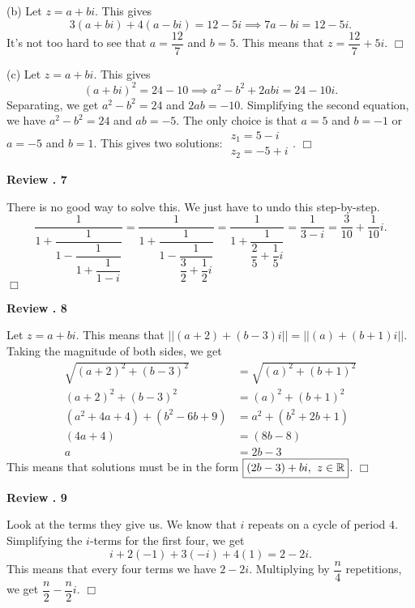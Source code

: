 \documentclass[lang=en,11pt]{elegantbook}
\begin{document}
(b) Let $z=a+bi$.  This gives $$3(a+bi)+4(a-bi)=12-5i \implies 7a-bi=12-5i.$$  It's not too hard to see that $a=\dfrac{12}{7}$ and $b=5$.  This means that $\boxed{z=\dfrac{12}{7}+5i}.$ $\Box$\vspace{3mm}

(c) Let $z=a+bi$.  This gives $$(a+bi)^2=24-10 \implies a^2-b^2+2abi=24-10i.$$  Separating, we get $a^2-b^2=24$ and $2ab=-10$.  Simplifying the second equation, we have $a^2-b^2=24$ and $ab=-5$.  The only choice is that $a=5$ and $b=-1$ or $a=-5$ and $b=1$.  This gives two solutions: $\boxed{\begin{matrix} z_1=5-i \\ z_2=-5+i \end{matrix}}.$ $\Box$\vspace{3mm}

\noindent \textbf{Review . 7}

There is no good way to solve this.  We just have to undo this step-by-step.  $$\dfrac{1}{1+\dfrac{1}{1-\dfrac{1}{1+\dfrac{1}{1-i}}}}= \dfrac{1}{1+\dfrac{1}{1-\dfrac{1}{\dfrac{3}{2}+\dfrac{1}{2}i}}}= \dfrac{1}{1+\dfrac{1}{\dfrac{2}{5}+\dfrac{1}{5}i}}=\dfrac{1}{3-i}=\boxed{\frac{3}{10}+\dfrac{1}{10}i}.$$ $\Box$\vspace{3mm}

\noindent \textbf{Review . 8}

Let $z=a+bi$.  This means that $||(a+2)+(b-3)i||=||(a)+(b+1)i||.$  Taking the magnitude of both sides, we get \begin{align*}
    \sqrt{(a+2)^2+(b-3)^2}&=\sqrt{(a)^2+(b+1)^2} \\ 
    (a+2)^2+(b-3)^2&=(a)^2+(b+1)^2 \\
    (a^2+4a+4)+(b^2-6b+9)&=a^2+(b^2+2b+1) \\ 
    (4a+4)&=(8b-8)  \\
    a&=2b-3
\end{align*}
This means that solutions must be in the form $\boxed{(2b-3)+bi, \hspace{0.05in} z\in\mathbb{R}}$. $\Box$\vspace{3mm}

\noindent \textbf{Review . 9}

Look at the terms they give us.  We know that $i$ repeats on a cycle of period $4$.  Simplifying the $i$-terms for the first four, we get $$i+2(-1)+3(-i)+4(1)=2-2i.$$  This means that every four terms we have $2-2i$.  Multiplying by $\dfrac{n}{4}$ repetitions, we get $\boxed{\dfrac{n}{2}-\dfrac{n}{2}i}.$ $\Box$\vspace{3mm}
\end{document}
